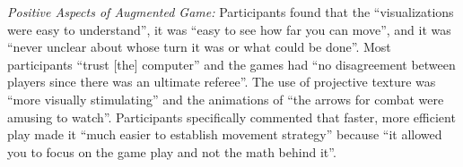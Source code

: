 \documentclass[10pt,twocolumn,letterpaper]{article}
\begin{document}

{\em Positive Aspects of Augmented Game:} %
%
%
%
%
Participants found that the ``visualizations were easy to understand'',
it was
``easy to see how far you can move'',
and it was ``never unclear about whose turn it was or what could be done''.
%
Most participants ``trust [the] computer'' and the games had
``no disagreement between players since there was an ultimate referee''.
%
The use of projective texture was  ``more visually stimulating''
and the animations of
``the arrows for combat were amusing to watch''.
%
Participants specifically commented that faster, more
efficient play made it ``much easier to establish movement strategy''
because ``it allowed you to focus on the game play and not the math
behind it''.

\end{document}
